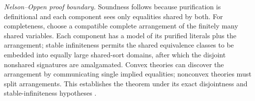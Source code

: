 \noindent\emph{Nelson--Oppen proof boundary.}
Soundness follows because purification is definitional and each component sees
only equalities shared by both. For completeness, choose a compatible complete
arrangement of the finitely many shared variables. Each component has a model
of its purified literals plus the arrangement; stable infiniteness permits the
shared equivalence classes to be embedded into equally large shared-sort
domains, after which the disjoint nonshared signatures are amalgamated. Convex
theories can discover the arrangement by communicating single implied
equalities; nonconvex theories must split arrangements. This establishes the
theorem under its exact disjointness and stable-infiniteness hypotheses
\cite{NelsonOppen1979}.
